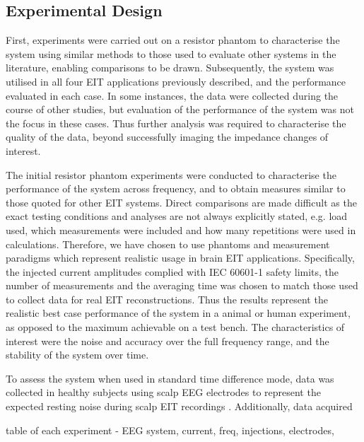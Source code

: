 \subsection{Experimental Design}

First, experiments were carried out on a resistor phantom to characterise the system using similar methods to those used to evaluate other systems in the literature, enabling comparisons to be drawn. Subsequently, the system was utilised in all four EIT applications previously described, and the performance evaluated in each case. In some instances, the data were collected during the course of other studies, but evaluation of the performance of the system was not the focus in these cases. Thus further analysis was required to characterise the quality of the data, beyond successfully imaging the impedance changes of interest. 

The initial resistor phantom experiments were conducted to characterise the performance of the system across frequency, and to obtain measures similar to those quoted for other EIT systems. Direct comparisons are made difficult as the exact testing conditions and analyses are not always explicitly stated, e.g. load used, which measurements were included and how many repetitions were used in calculations. Therefore, we have chosen to use phantoms and measurement paradigms which represent realistic usage in brain EIT applications. Specifically, the injected current amplitudes complied with IEC 60601-1 \cite{IEC} safety limits, the number of measurements and the averaging time was chosen to match those used to collect data for real EIT reconstructions. Thus the results represent the realistic best case performance of the system  in a animal or human experiment, as opposed to the maximum achievable on a test bench. The characteristics of interest were the noise and accuracy over the full frequency range, and the stability of the system over time.

To assess the system when used in standard time difference mode, data was collected in healthy subjects using scalp EEG electrodes to represent the expected resting noise during scalp EIT recordings  \cite{Fabrizi_2006,fabrizi2007analysis,Romsauerova2006}. Additionally, data acquired  \cite{Dowrick_2016}


table of each experiment - EEG system, current, freq, injections, electrodes, 
